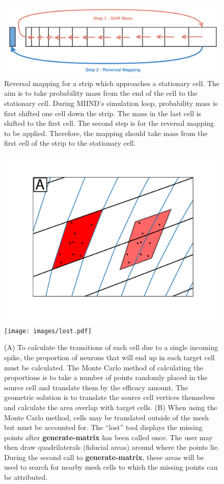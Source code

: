 \documentclass[utf8]{frontiersSCNS} %
\begin{document}
\begin{figure}[!htb]
  \centering
  \includegraphics[width=\columnwidth]{images/reversal.png}
  \caption{Reversal mapping for a strip which approaches a stationary cell. The aim is to take probability mass from the end of the cell to the stationary cell. During MIIND's simulation loop, probability mass is first shifted one cell down the strip. The mass in the last cell is shifted to the first cell. The second step is for the reversal mapping to be applied. Therefore, the mapping should take mass from the first cell of the strip to the stationary cell.}
  \label{fig:reversal}
\end{figure}

\begin{figure}[!htb]
  \centering
  \includegraphics[width=0.45\columnwidth]{images/matrix_transition.pdf}
  \texttt{[image: images/lost.pdf]}
  \caption{(A) To calculate the transitions of each cell due to a single incoming spike, the proportion of neurons that will end up in each target cell must be calculated. The Monte Carlo method of calculating the proportions is to take a number of points randomly placed in the source cell and translate them by the efficacy amount. The geometric solution is to translate the source cell vertices themselves and calculate the area overlap with target cells. (B) When using the Monte Carlo method, cells may be translated outside of the mesh but must be accounted for. The ``lost'' tool displays the missing points after \textbf{generate-matrix} has been called once. The user may then draw quadrilaterals (fiducial areas) around where the points lie. During the second call to \textbf{generate-matrix}, these areas will be used to search for nearby mesh cells to which the missing points can be attributed. }
  \label{fig:transitionlost}
\end{figure}
\end{document}
